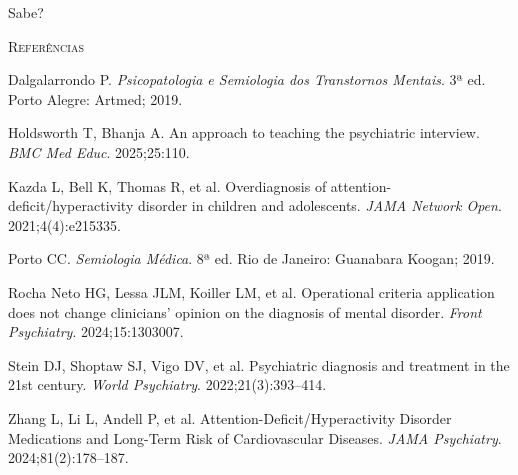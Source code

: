 Sabe?

\vspace{2em}
\begin{small}
\noindent\textsc{Referências}

\vspace{1em}
\noindent Dalgalarrondo P. \textit{Psicopatologia e Semiologia dos Transtornos Mentais}. 3ª ed. Porto Alegre: Artmed; 2019.

\noindent Holdsworth T, Bhanja A. An approach to teaching the psychiatric interview. \textit{BMC Med Educ}. 2025;25:110.

\noindent Kazda L, Bell K, Thomas R, et al. Overdiagnosis of attention-deficit/hyperactivity disorder in children and adolescents. \textit{JAMA Network Open}. 2021;4(4):e215335.

\noindent Porto CC. \textit{Semiologia Médica}. 8ª ed. Rio de Janeiro: Guanabara Koogan; 2019.

\noindent Rocha Neto HG, Lessa JLM, Koiller LM, et al. Operational criteria application does not change clinicians' opinion on the diagnosis of mental disorder. \textit{Front Psychiatry}. 2024;15:1303007.

\noindent Stein DJ, Shoptaw SJ, Vigo DV, et al. Psychiatric diagnosis and treatment in the 21st century. \textit{World Psychiatry}. 2022;21(3):393--414.

\noindent Zhang L, Li L, Andell P, et al. Attention-Deficit/Hyperactivity Disorder Medications and Long-Term Risk of Cardiovascular Diseases. \textit{JAMA Psychiatry}. 2024;81(2):178--187.
\end{small}
